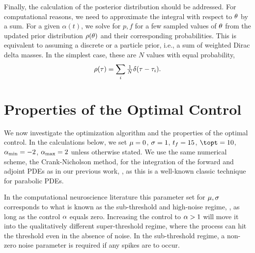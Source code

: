 Finally, the calculation of the posterior distribution should be addressed. For
computational reasons, we need to approximate the integral with respect to ${ \theta}$
by a sum. For a given $\alpha(t)$, we solve for $p,f$ for a few sampled values
of ${ \theta}$ from the updated prior distribution $\rho({ \theta})$ and their corresponding
probabilities. This is equivalent to assuming a discrete or a particle prior,
i.e., a sum of weighted Dirac delta masses. In the simplest case, these are $N$
values with equal probability,
\begin{equation}
\rho({ \tau }) = \sum_i  
	\tfrac 1N \delta({ \tau }- { \tau }_i) .
\label{eq:basic_prior_over_tau}
\end{equation} 
 
\section{Properties of the Optimal Control}
\label{sec:sim_study}
 
We now investigate the optimization algorithm and the properties of the optimal
control. In the calculations below, we set  ${\mu }=0$, $\sigma = 1$, ${ t_f }=15$, $\topt =
10$, ${ \alpha_{\textrm{min}} }=-2$, ${ \alpha_{\textrm{max}} }=2$ unless otherwise stated. 
We use the same numerical scheme, the Crank-Nicholson method, for the
integration of the forward and adjoint PDEs as in our previous work,
\cite{Iolov2014a}, as this is a well-known classic technique for parabolic PDEs. 
 
In the computational neuroscience
literature this parameter set for ${\mu },\sigma$ corresponds to what is known as the
sub-threshold and high-noise regime, \cite{Iolov2013}, as long as the control $\alpha$ equals
zero. Increasing the control to $\alpha>1$ will move it into the
qualitatively different 
super-threshold regime, where the process can hit the
threshold even in the absence of noise. In the sub-threshold regime, a
non-zero noise parameter is required if any spikes are to occur.

\

